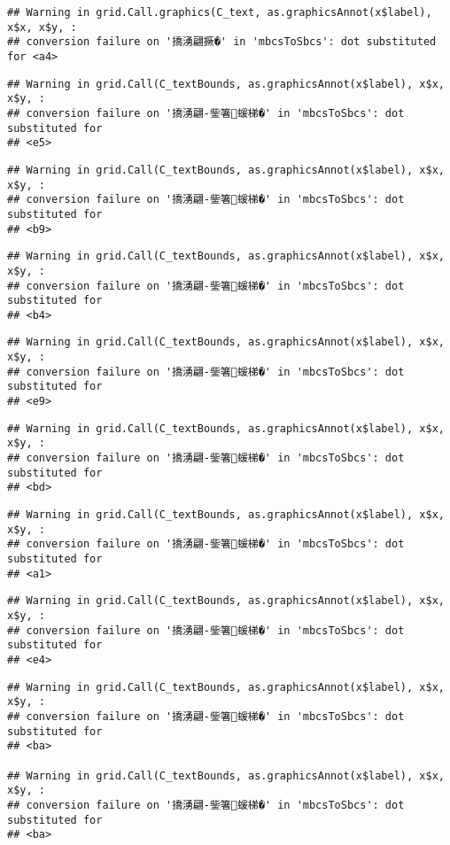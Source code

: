 \documentclass[
]{article}
\begin{document}
\begin{verbatim}
## Warning in grid.Call.graphics(C_text, as.graphicsAnnot(x$label), x$x, x$y, :
## conversion failure on '撟湧翩撅�' in 'mbcsToSbcs': dot substituted for <a4>
\end{verbatim}

\begin{verbatim}
## Warning in grid.Call(C_textBounds, as.graphicsAnnot(x$label), x$x, x$y, :
## conversion failure on '撟湧翩-鈭箸蝯梯�' in 'mbcsToSbcs': dot substituted for
## <e5>
\end{verbatim}

\begin{verbatim}
## Warning in grid.Call(C_textBounds, as.graphicsAnnot(x$label), x$x, x$y, :
## conversion failure on '撟湧翩-鈭箸蝯梯�' in 'mbcsToSbcs': dot substituted for
## <b9>
\end{verbatim}

\begin{verbatim}
## Warning in grid.Call(C_textBounds, as.graphicsAnnot(x$label), x$x, x$y, :
## conversion failure on '撟湧翩-鈭箸蝯梯�' in 'mbcsToSbcs': dot substituted for
## <b4>
\end{verbatim}

\begin{verbatim}
## Warning in grid.Call(C_textBounds, as.graphicsAnnot(x$label), x$x, x$y, :
## conversion failure on '撟湧翩-鈭箸蝯梯�' in 'mbcsToSbcs': dot substituted for
## <e9>
\end{verbatim}

\begin{verbatim}
## Warning in grid.Call(C_textBounds, as.graphicsAnnot(x$label), x$x, x$y, :
## conversion failure on '撟湧翩-鈭箸蝯梯�' in 'mbcsToSbcs': dot substituted for
## <bd>
\end{verbatim}

\begin{verbatim}
## Warning in grid.Call(C_textBounds, as.graphicsAnnot(x$label), x$x, x$y, :
## conversion failure on '撟湧翩-鈭箸蝯梯�' in 'mbcsToSbcs': dot substituted for
## <a1>
\end{verbatim}

\begin{verbatim}
## Warning in grid.Call(C_textBounds, as.graphicsAnnot(x$label), x$x, x$y, :
## conversion failure on '撟湧翩-鈭箸蝯梯�' in 'mbcsToSbcs': dot substituted for
## <e4>
\end{verbatim}

\begin{verbatim}
## Warning in grid.Call(C_textBounds, as.graphicsAnnot(x$label), x$x, x$y, :
## conversion failure on '撟湧翩-鈭箸蝯梯�' in 'mbcsToSbcs': dot substituted for
## <ba>

## Warning in grid.Call(C_textBounds, as.graphicsAnnot(x$label), x$x, x$y, :
## conversion failure on '撟湧翩-鈭箸蝯梯�' in 'mbcsToSbcs': dot substituted for
## <ba>
\end{verbatim}
\end{document}
